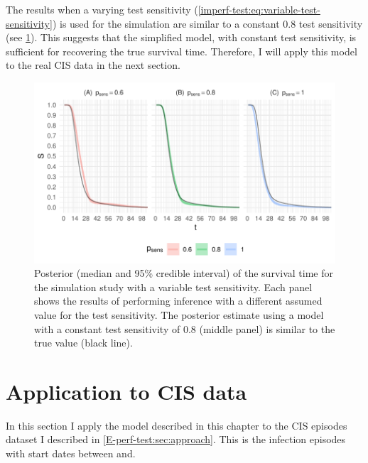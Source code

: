 \documentclass[thesis.tex]{subfiles}
\begin{document}
The results when a varying test sensitivity (\cref{imperf-test:eq:variable-test-sensitivity}) is used for the simulation are similar to a constant 0.8 test sensitivity (see \cref{imperf-test:fig:variable-test-sensitivity}).
This suggests that the simplified model, with constant test sensitivity, is sufficient for recovering the true survival time.
Therefore, I will apply this model to the real CIS data in the next section.
\begin{figure}
    \includegraphics[width=\textwidth]{cis-imperfect-testing/sim-variable-sensitivity}
  \caption[Simulation study results with varying test sensitivity]{%
    Posterior (median and 95\% credible interval) of the survival time for the simulation study with a variable test sensitivity.
    Each panel shows the results of performing inference with a different assumed value for the test sensitivity.
    The posterior estimate using a model with a constant test sensitivity of 0.8 (middle panel) is similar to the true value (black line).
  }
  \label{imperf-test:fig:variable-test-sensitivity}
\end{figure}

\section{Application to CIS data} \label{imperf-test:sec:application}

In this section I apply the model described in this chapter to the CIS episodes dataset I described in \cref{E-perf-test:sec:approach}.
This is the infection episodes with start dates between and.
\end{document}
